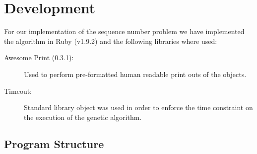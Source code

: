 \documentclass[a4paper,10pt,titlepage]{article}
\begin{document}
\section{Development}
\par For our implementation of the sequence number problem we have implemented the algorithm in Ruby (v1.9.2) and the following libraries where used: 
\begin{description}
	\item[Awesome Print (0.3.1):] Used to perform pre-formatted human readable print outs of the objects.
	\item[Timeout:] Standard library object was used in order to enforce the time constraint on the execution of the genetic algorithm.
\end{description}

\subsection{Program Structure}
\end{document}
